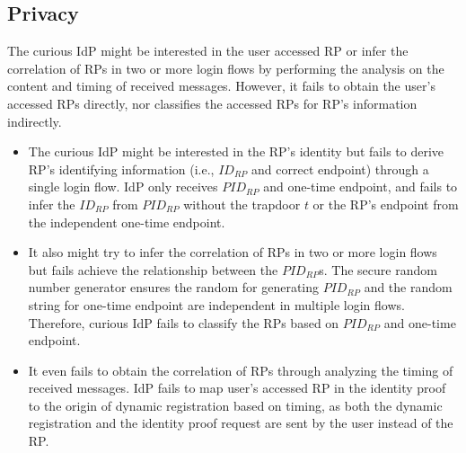 \subsection{Privacy}
\label{subsec:privacy}
 The curious IdP might be interested in the user accessed RP or infer the correlation of RPs in two or more login flows by performing the analysis on the content and timing of received messages. However, it fails to obtain the user's accessed RPs directly, nor classifies the accessed RPs for RP's information indirectly.
\begin{itemize}
  \item The curious IdP might be interested in the RP's identity but fails to derive RP's identifying information (i.e., $ID_{RP}$ and correct endpoint) through a single login flow. IdP only receives $PID_{RP}$ and one-time endpoint, and fails to infer the $ID_{RP}$ from $PID_{RP}$ without the  trapdoor $t$
  or the RP's endpoint from the independent one-time endpoint.
  \item It also might try to infer the correlation of RPs in two or more login flows but fails achieve the relationship between the $PID_{RP}$s. The secure random number generator ensures the random for generating $PID_{RP}$ and the random string for one-time endpoint are independent in multiple login flows. Therefore, curious IdP fails to classify the RPs based on $PID_{RP}$ and one-time endpoint.
  \item It even fails to obtain the correlation of RPs through analyzing the timing of received messages. IdP fails to map user's accessed RP in the identity proof to the origin of dynamic registration based on {\color{red} timing, as both the dynamic registration and the identity proof request are sent by the user instead of the RP.}
\end{itemize}

